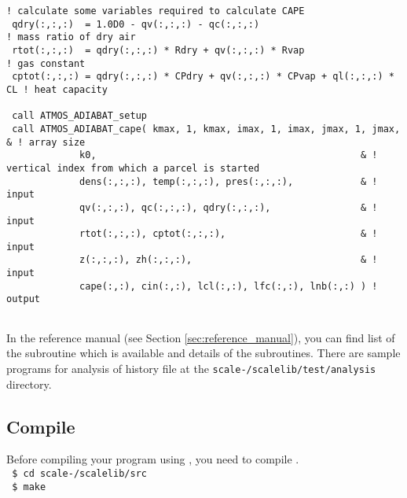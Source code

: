 {  \verb|! calculate some variables required to calculate CAPE|\\
  \verb| qdry(:,:,:)  = 1.0D0 - qv(:,:,:) - qc(:,:,:)                            ! mass ratio of dry air|\\
  \verb| rtot(:,:,:)  = qdry(:,:,:) * Rdry + qv(:,:,:) * Rvap                    ! gas constant|\\
  \verb| cptot(:,:,:) = qdry(:,:,:) * CPdry + qv(:,:,:) * CPvap + ql(:,:,:) * CL ! heat capacity|\\
  \verb|                         |\\
  \verb| call ATMOS_ADIABAT_setup|\\
  \verb| call ATMOS_ADIABAT_cape( kmax, 1, kmax, imax, 1, imax, jmax, 1, jmax,      & ! array size|\\
  \hspace{12em}\verb|             k0,                                               & ! vertical index from which a parcel is started  |\\
  \hspace{12em}\verb|             dens(:,:,:), temp(:,:,:), pres(:,:,:),            & ! input|\\
  \hspace{12em}\verb|             qv(:,:,:), qc(:,:,:), qdry(:,:,:),                & ! input|\\
  \hspace{12em}\verb|             rtot(:,:,:), cptot(:,:,:),                        & ! input|\\
  \hspace{12em}\verb|             z(:,:,:), zh(:,:,:),                              & ! input|\\
  \hspace{12em}\verb|             cape(:,:), cin(:,:), lcl(:,:), lfc(:,:), lnb(:,:) ) ! output|\\
  \verb| |\\
}


In the reference manual (see Section \ref{sec:reference_manual}), you can find list of the subroutine which is available and details of the subroutines.
There are sample programs for analysis of \scalerm history file at the \texttt{scale-\version/scalelib/test/analysis} directory.


\subsection{Compile}

Before compiling your program using \scalelib, you need to compile \scalelib.\\
\texttt{ \$ cd scale-\version/scalelib/src}\\
\texttt{ \$ make}

